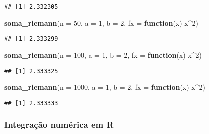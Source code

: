 \documentclass[
]{article}
\newenvironment{Shaded}{\begin{snugshade}}{\end{snugshade}}
\newcommand{\AttributeTok}[1]{\textcolor[rgb]{0.13,0.29,0.53}{#1}}
\newcommand{\ControlFlowTok}[1]{\textcolor[rgb]{0.13,0.29,0.53}{\textbf{#1}}}
\newcommand{\DecValTok}[1]{\textcolor[rgb]{0.00,0.00,0.81}{#1}}
\newcommand{\FunctionTok}[1]{\textcolor[rgb]{0.13,0.29,0.53}{\textbf{#1}}}
\newcommand{\NormalTok}[1]{#1}
\newcommand{\SpecialCharTok}[1]{\textcolor[rgb]{0.81,0.36,0.00}{\textbf{#1}}}
\begin{document}
\begin{verbatim}
## [1] 2.332305
\end{verbatim}

\begin{Shaded}
\begin{Highlighting}[]
\FunctionTok{soma\_riemann}\NormalTok{(}\AttributeTok{n =} \DecValTok{50}\NormalTok{, }\AttributeTok{a =} \DecValTok{1}\NormalTok{, }\AttributeTok{b =} \DecValTok{2}\NormalTok{, }\AttributeTok{fx =} \ControlFlowTok{function}\NormalTok{(x) x}\SpecialCharTok{\^{}}\DecValTok{2}\NormalTok{)}
\end{Highlighting}
\end{Shaded}

\begin{verbatim}
## [1] 2.333299
\end{verbatim}

\begin{Shaded}
\begin{Highlighting}[]
\FunctionTok{soma\_riemann}\NormalTok{(}\AttributeTok{n =} \DecValTok{100}\NormalTok{, }\AttributeTok{a =} \DecValTok{1}\NormalTok{, }\AttributeTok{b =} \DecValTok{2}\NormalTok{, }\AttributeTok{fx =} \ControlFlowTok{function}\NormalTok{(x) x}\SpecialCharTok{\^{}}\DecValTok{2}\NormalTok{)}
\end{Highlighting}
\end{Shaded}

\begin{verbatim}
## [1] 2.333325
\end{verbatim}

\begin{Shaded}
\begin{Highlighting}[]
\FunctionTok{soma\_riemann}\NormalTok{(}\AttributeTok{n =} \DecValTok{1000}\NormalTok{, }\AttributeTok{a =} \DecValTok{1}\NormalTok{, }\AttributeTok{b =} \DecValTok{2}\NormalTok{, }\AttributeTok{fx =} \ControlFlowTok{function}\NormalTok{(x) x}\SpecialCharTok{\^{}}\DecValTok{2}\NormalTok{)}
\end{Highlighting}
\end{Shaded}

\begin{verbatim}
## [1] 2.333333
\end{verbatim}

\hypertarget{integrauxe7uxe3o-numuxe9rica-em-r}{%
\subsubsection{Integração numérica em
R}\label{integrauxe7uxe3o-numuxe9rica-em-r}}
\end{document}
